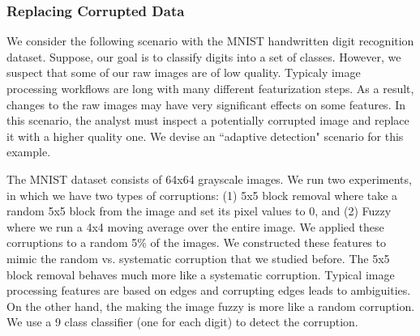 \subsubsection{Replacing Corrupted Data}
We consider the following scenario with the MNIST handwritten digit recognition dataset.
Suppose, our goal is to classify digits into a set of classes.
However, we suspect that some of our raw images are of low quality.
Typicaly image processing workflows are long with many different featurization steps.
As a result, changes to the raw images may have very significant effects on some features.
In this scenario, the analyst must inspect a potentially corrupted image and replace it with a higher quality one.
We devise an ``adaptive detection" \sys scenario for this example.

The MNIST dataset consists of 64x64 grayscale images.
We run two experiments, in which we have two types of corruptions: (1) 5x5 block removal where take a random 5x5 block from the image and set its pixel values to 0, and (2) Fuzzy where we run a 4x4 moving average over the entire image.
We applied these corruptions to a random 5\% of the images.
We constructed these features to mimic the random vs. systematic corruption that we studied before.
The 5x5 block removal behaves much more like a systematic corruption. 
Typical image processing features are based on edges and corrupting edges leads to ambiguities.
On the other hand, the making the image fuzzy is more like a random corruption.
We use a 9 class classifier (one for each digit) to detect the corruption.



